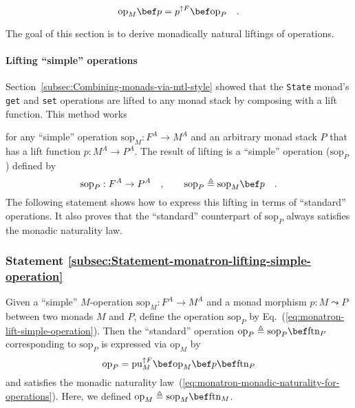 ~\vspace{-0.45\baselineskip}
\begin{equation}
\text{op}_{M}\bef p=p^{\uparrow F}\bef\text{op}_{P}\quad.\label{eq:monatron-monadic-naturality-for-operations}
\end{equation}

\noindent The goal of this section is to derive monadically natural
liftings of operations.

\paragraph{Lifting \textsf{``}simple\textsf{''} operations}

Section~\ref{subsec:Combining-monads-via-mtl-style} showed that
the \lstinline!State! monad\textsf{'}s \lstinline!get! and \lstinline!set!
operations are lifted to any monad stack by composing with a lift
function. This method works %
\begin{comment}
equally well 
\end{comment}
for any \textsf{``}simple\textsf{''} operation $\text{sop}_{M}:F^{A}\rightarrow M^{A}$
and an arbitrary monad stack $P$ that has a lift function $p:M^{A}\rightarrow P^{A}$.
The result of lifting is a \textsf{``}simple\textsf{''} operation ($\text{sop}_{P}$)
defined by
\begin{equation}
\text{sop}_{P}:F^{A}\rightarrow P^{A}\quad,\quad\quad\text{sop}_{P}\triangleq\text{sop}_{M}\bef p\quad.\label{eq:monatron-lift-simple-operation}
\end{equation}
The following statement shows how to express this lifting in terms
of \textsf{``}standard\textsf{''} operations. It also proves that the \textsf{``}standard\textsf{''}
counterpart of $\text{sop}_{P}$ always satisfies the monadic naturality
law.

\subsubsection{Statement \label{subsec:Statement-monatron-lifting-simple-operation}\ref{subsec:Statement-monatron-lifting-simple-operation}}

Given a \textsf{``}simple\textsf{''} $M$-operation $\text{sop}_{M}:F^{A}\rightarrow M^{A}$
and a monad morphism $p:M\leadsto P$ between two monads $M$ and
$P$, define the operation $\text{sop}_{P}$ by Eq.~(\ref{eq:monatron-lift-simple-operation}).
Then the \textsf{``}standard\textsf{''} operation $\text{op}_{P}\triangleq\text{sop}_{P}\bef\text{ftn}_{P}$
corresponding to $\text{sop}_{P}$ is expressed via $\text{op}_{M}$
by
\begin{equation}
\text{op}_{P}=\text{pu}_{M}^{\uparrow F}\bef\text{op}_{M}\bef p\bef\text{ftn}_{P}\label{eq:monatron-lifting-simple-op}
\end{equation}
and satisfies the monadic naturality law~(\ref{eq:monatron-monadic-naturality-for-operations}).
Here, we defined $\text{op}_{M}\triangleq\text{sop}_{M}\bef\text{ftn}_{M}$.

